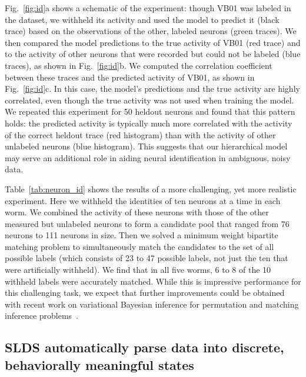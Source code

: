 \documentclass[11pt]{article}
\begin{document}
Fig.~\ref{fig:id}a shows a schematic of the experiment: though VB01
was labeled in the dataset, we withheld its activity and used the
model to predict it (black trace) based on the observations of the
other, labeled neurons (green traces).  We then compared the model
predictions to the true activity of VB01 (red trace) and to the
activity of other neurons that were recorded but could not be labeled
(blue traces), as shown in Fig.~\ref{fig:id}b.  We computed the
correlation coefficient between these traces and the predicted
activity of VB01, as shown in Fig.~\ref{fig:id}c.  In this case, the
model's predictions and the true activity are highly correlated, even
though the true activity was not used when training the model.  We
repeated this experiment for 50 heldout neurons and found that this
pattern holds: the predicted activity is typically much more
correlated with the activity of the correct heldout trace (red
histogram) than with the activity of other unlabeled neurons (blue
histogram).  This suggests that our hierarchical model may serve an
additional role in aiding neural identification in ambiguous, noisy
data.

Table~\ref{tab:neuron_id} shows the results of a more challenging, yet
more realistic experiment.  Here we withheld the identities of ten
neurons at a time in each worm.  We combined the activity of these
neurons with those of the other measured but unlabeled neurons to form
a candidate pool that ranged from 76 neurons to 111 neurons in size.
Then we solved a minimum weight bipartite matching problem to
simultaneously match the candidates to the set of all possible labels
(which consists of 23 to 47 possible labels, not just the ten that
were artificially withheld).  We find that in all five worms, 6 to 8
of the 10 withheld labels were accurately matched.  While this is
impressive performance for this challenging task, we expect that
further improvements could be obtained with recent work on variational
Bayesian inference for permutation and matching inference
problems~\citep{linderman2018reparameterizing}.


\subsection*{SLDS automatically parse data into discrete, behaviorally meaningful states}
\end{document}
